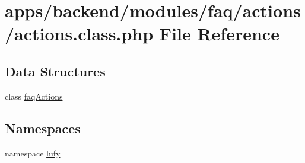 \hypertarget{backend_2modules_2faq_2actions_2actions_8class_8php}{\section{apps/backend/modules/faq/actions/actions.class.\-php File Reference}
\label{backend_2modules_2faq_2actions_2actions_8class_8php}
}
\subsection*{Data Structures}
\begin{DoxyCompactItemize}
\item 
class \hyperlink{classfaq_actions}{faq\-Actions}
\end{DoxyCompactItemize}
\subsection*{Namespaces}
\begin{DoxyCompactItemize}
\item 
namespace \hyperlink{namespacelufy}{lufy}
\end{DoxyCompactItemize}
